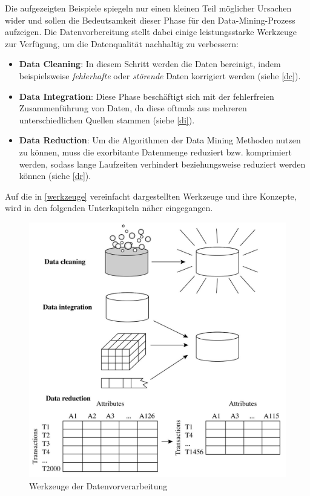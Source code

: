 Die aufgezeigten Beispiele spiegeln nur einen kleinen Teil möglicher Ursachen wider und sollen die Bedeutsamkeit dieser Phase für den Data-Mining-Prozess aufzeigen. Die Datenvorbereitung stellt dabei einige leistungsstarke Werkzeuge zur Verfügung, um die Datenqualität nachhaltig zu verbessern:

\begin{itemize}
\item \textbf{Data Cleaning}: In diesem Schritt werden die Daten bereinigt, indem beispielsweise \textit{fehlerhafte} oder \textit{störende} Daten korrigiert werden (siehe \vref{dc}).

\item \textbf{Data Integration}: Diese Phase beschäftigt sich mit der fehlerfreien Zusammenführung von Daten, da diese oftmals aus mehreren unterschiedlichen Quellen stammen (siehe \vref{di}).

\item \textbf{Data Reduction}: Um die Algorithmen der Data Mining Methoden nutzen zu können, muss die exorbitante Datenmenge reduziert bzw. komprimiert werden, sodass lange Laufzeiten verhindert beziehungsweise reduziert werden können (siehe \vref{dr}).
\end{itemize}

Auf die in \vref{werkzeuge} vereinfacht dargestellten Werkzeuge und ihre Konzepte, wird in den folgenden Unterkapiteln näher eingegangen.

\begin{figure}[H]
\centering
\includegraphics[scale=1.2]{se-wa-jpg/preprocessing}
\caption[Werkzeuge der Datenvorverarbeitung]{Werkzeuge der Datenvorverarbeitung\protect\footnotemark}
\label{werkzeuge}
\end{figure}


